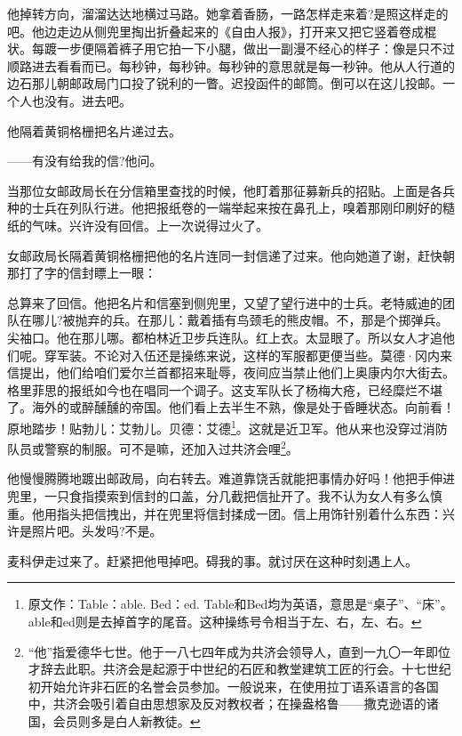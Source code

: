 \par 他掉转方向，溜溜达达地横过马路。她拿着香肠，一路怎样走来着?是照这样走的吧。他边走边从侧兜里掏出折叠起来的《自由人报》，打开来又把它竖着卷成棍状。每踱一步便隔着裤子用它拍一下小腿，做出一副漫不经心的样子：像是只不过顺路进去看看而已。每秒钟，每秒钟。每秒钟的意思就是每一秒钟。他从人行道的边石那儿朝邮政局门口投了锐利的一瞥。迟投函件的邮筒。倒可以在这儿投邮。一个人也没有。进去吧。
\par 他隔着黄铜格栅把名片递过去。
\par ——有没有给我的信?他问。
\par 当那位女邮政局长在分信箱里查找的时候，他盯着那征募新兵的招贴。上面是各兵种的士兵在列队行进。他把报纸卷的一端举起来按在鼻孔上，嗅着那刚印刷好的糙纸的气味。兴许没有回信。上一次说得过火了。
\par 女邮政局长隔着黄铜格栅把他的名片连同一封信递了过来。他向她道了谢，赶快朝那打了字的信封瞟上一眼：
\par 总算来了回信。他把名片和信塞到侧兜里，又望了望行进中的士兵。老特威迪的团队在哪儿?被抛弃的兵。在那儿：戴着插有鸟颈毛的熊皮帽。不，那是个掷弹兵。尖袖口。他在那儿哪。都柏林近卫步兵连队。红上衣。太显眼了。所以女人才追他们呢。穿军装。不论对入伍还是操练来说，这样的军服都更便当些。莫德·冈内来信提出，他们给咱们爱尔兰首都招来耻辱，夜间应当禁止他们上奥康内尔大街去。格里菲思的报纸如今也在唱同一个调子。这支军队长了杨梅大疮，已经糜烂不堪了。海外的或醉醺醺的帝国。他们看上去半生不熟，像是处于昏睡状态。向前看！原地踏步！贴勃儿：艾勃儿。贝德：艾德\footnote{原文作：Table：able. Bed：ed. Table和Bed均为英语，意思是“桌子”、“床”。able和ed则是去掉首字的尾音。这种操练号令相当于左、右，左、右。}。这就是近卫军。他从来也没穿过消防队员或警察的制服。可不是嘛，还加入过共济会哩\footnote{“他”指爱德华七世。他于一八七四年成为共济会领导人，直到一九〇一年即位才辞去此职。共济会是起源于中世纪的石匠和教堂建筑工匠的行会。十七世纪初开始允许非石匠的名誉会员参加。一般说来，在使用拉丁语系语言的各国中，共济会吸引着自由思想家及反对教权者；在操盎格鲁——撒克逊语的诸国，会员则多是白人新教徒。}。
\par 他慢慢腾腾地踱出邮政局，向右转去。难道靠饶舌就能把事情办好吗！他把手伸进兜里，一只食指摸索到信封的口盖，分几截把信扯开了。我不认为女人有多么慎重。他用指头把信拽出，并在兜里将信封揉成一团。信上用饰针别着什么东西：兴许是照片吧。头发吗?不是。
\par 麦科伊走过来了。赶紧把他甩掉吧。碍我的事。就讨厌在这种时刻遇上人。
